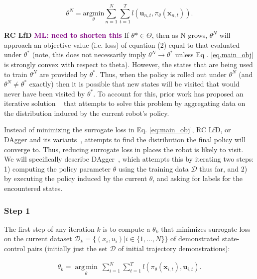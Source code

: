 \documentclass[10pt, conference]{ieeeconf}      %
\DeclareMathOperator*{\argmin}{arg\,min}
\newcommand{\bu}{\mathbf{u}}
\newcommand{\bx}{\mathbf{x}}
\newcommand{\nc}{RC LfD }
\newcommand{\mlnote}[1]{\ifthenelse{ \boolean{include-notes}}%
 {\textcolor{purple}{\textbf{ML: #1}}}{}}
\begin{document}
\begin{equation}\label{eq:main_obj}
\theta^N = \underset{\theta}{\mbox{argmin}} \sum^N_{n=1}\sum^T_{t=1} l(\bu_{n,t}, \pi_{\theta} (\bx_{n,t})).
\end{equation}


\noindent \textbf{\nc} \mlnote{need to shorten this} If $\theta* \in \Theta$, then as N grows, $
\theta^N$ will approach an objective value (i.e. loss) of equation (2) equal to that evaluated under $\theta^*$ (note, this does not necessarily imply $\theta^N \rightarrow \theta^*$ unless  Eq . \ref{eq.main_obj} is strongly convex with respect to theta). However, the states that are being used to train $\theta^N$ are provided by $\theta^*$. Thus, when the policy is rolled out under $\theta^N$ (and $\theta^N \neq \theta^*$ exactly) then it is possible that new states will be visited that would never have been visited by $\theta^*$. To account for this, prior work has proposed an iterative solution ~\cite{ross2010reduction} that attempts to solve this problem by aggregating data on the distribution induced by the current robot's policy.

Instead of  minimizing the surrogate loss in Eq. \ref{eq:main_obj},  RC LfD, or DAgger and its variants~\cite{ross2010reduction,laskeyshiv,he2012imitation}, attempts to find the distribution the final policy will converge to. Thus, reducing surrogate loss in places the robot is likely to visit.
We will specifically describe DAgger~\cite{ross2010reduction}, which attempts this by iterating two steps: 1)
computing the policy parameter $\theta$ using the training data $\mathcal{D}$ thus far, and 2) by executing the policy
induced by the current $\theta$, and asking for labels for the encountered states. 
 
\subsubsection{Step 1}
The first step of any iteration $k$ is to compute a $\theta_k$ that minimizes surrogate loss on the current dataset $\mathcal{D}_k=\{(x_i,u_i)|i\in\{1,\ldots,N\}\}$ of demonstrated state-control pairs (initially just the set $\mathcal{D}$ of initial trajectory demonstrations):

 \vspace{-1ex}
\begin{align}\label{eq:super_objj}
\theta_{k} = \underset{\theta}{\argmin} \: \sum_{i=1}^{N} \sum_{t=1}^T  l(\pi_{\theta}(\bx_{i,t}),\bu_{i,t}).
\end{align}
\end{document}
